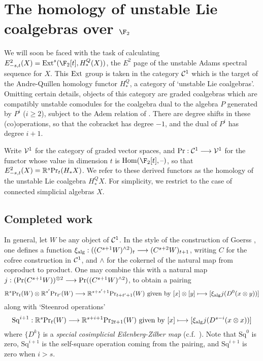 \documentclass[11pt]{article}
\newcommand{\Sq}{\mathrm{Sq}}
\begin{document}
\section{The homology of unstable Lie coalgebras over $\F_2$}
We will soon be faced with the task of calculating $E^2_{-s,t}(X)=\Ext^s(\F_2[t],H_*^Q(X))$, the $E^2$ page of the unstable Adams spectral sequence for $X$. This $\Ext$ group is taken in the category $\calC^1$ which is the target of the Andre-Quillen homology functor $H_*^Q$, a category of `unstable Lie coalgebras'. Omitting certain details, objects of this category are graded coalgebras which are compatibly unstable comodules for the coalgebra dual to the algebra $P$ generated by $P^i$ ($i\geq2$), subject to the Adem relation of \cite[p.17]{MR1089001}. There are degree shifts in these (co)operations, so that the cobracket has degree $-1$, and the dual of $P^i$ has degree $i+1$.

Write $\calV^1$ for the category of graded vector spaces, and $\textup{Pr}:\calC^1\to \calV^1$ for the functor whose value in dimension $t$ is $\Hom(\F_2[t],\DASH)$, so that $E^2_{-s,t}(X)=\mathbb{R}^s\textup{Pr}_t(H_*X)$. We refer to these derived functors as the homology of the unstable Lie coalgebra $H_*^QX$. For simplicity, we restrict to the case of connected simplicial algebras $X$.

\subsection{Completed work}\label{PastWorkOnE2LevelStructure}
In general, let $W$ be any object of $\calC^1$. In the style of the construction of Goerss  \cite[\S5]{MR1089001}, one defines a function $\xi_\textup{alg}:((C^{s+1}W)^{\wedge2})_{t}\to (C^{s+2}W)_{t+1}$, writing $C$ for the cofree construction in $\calC^1$, and $\wedge $ for the cokernel of the natural map from coproduct to product. One may combine this with a natural map $j:(\textup{Pr}(C^{s+1}W))^{\otimes2}\to \textup{Pr}((C^{s+1}W)^{\wedge 2})$, to obtain a pairing
\[\mathbb{R}^s\textup{Pr}_t(W)\otimes \mathbb{R}^{s'}\textup{Pr}_{t'}(W)\to \mathbb{R}^{s+s'+1}\textup{Pr}_{t+t'+1}(W)\textup{ given by }[x]\otimes [y]\mapsto [\xi_{\textup{alg}}j(D^0(x\otimes y))]\]
along with `Steenrod operations'
\[\Sq^{i+1}:\mathbb{R}^s\textup{Pr}_t(W)\to \mathbb{R}^{s+i+1}\textup{Pr}_{2t+1}(W)\textup{ given by }[x]\mapsto [\xi_{\textup{alg}}j(D^{s-i}(x\otimes x))]\]
where $\{D^k\}$ is a \emph{special cosimplicial Eilenberg-Zilber map} (c.f.\ \cite[5.2]{turner_opns_and_sseqs_I.pdf}). Note that $\Sq^0$ is zero, $\Sq^{i+1}$ is the self-square operation coming from the pairing, and $\Sq^{i+1}$ is zero when $i>s$.
\end{document}
